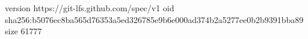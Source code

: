 version https://git-lfs.github.com/spec/v1
oid sha256:b5076ec8ba565d76353a5ed326785e9b6e000ad374b2a5277ee0b2b9391bba89
size 61777
